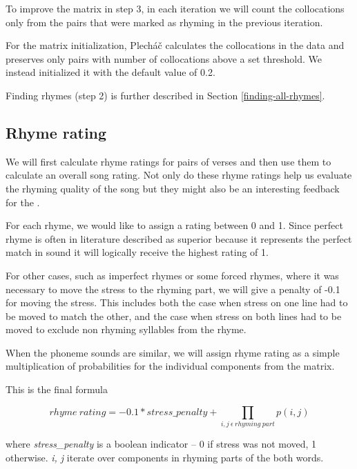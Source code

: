 To improve the matrix in step 3, in each iteration we will count the collocations only from the pairs that were marked as rhyming in the previous iteration.

For the matrix initialization, Plecháč calculates the collocations in the data and preserves only pairs with number of collocations above a set threshold. We instead initialized it with the default value of 0.2. 

Finding rhymes (step 2) is further described in Section \ref{finding-all-rhymes}.


\subsection{Rhyme rating}\label{rhyme-rating}
 We will first calculate rhyme ratings for pairs of verses and then use them to calculate an overall song rating. Not only do these rhyme ratings help us evaluate the rhyming quality of the song but they might also be an interesting feedback for the .
 
 
 For each rhyme, we would like to assign a rating between 0 and 1. Since perfect rhyme is often in literature described as superior because it represents the perfect match in sound it will logically receive the highest rating of 1.
 
 For other cases, such as imperfect rhymes or some forced rhymes, where it was necessary to move the stress to the rhyming part, we will give a penalty of -0.1 for moving the stress. This includes both the case when stress on one line had to be moved to match the other, and the case when stress on both lines had to be moved to exclude non rhyming syllables from the rhyme.
  
	When the phoneme sounds are similar, we will assign rhyme rating as a simple multiplication of probabilities for the individual components from the matrix. 

This is the final formula
	
	\[rhyme\ rating = -0.1 * stress\_penalty + \prod_{i,j\ \epsilon\ rhyming\ part} p(i,j) \]
	
where \textit{stress\_penalty} is a boolean indicator -- 0 if stress was not moved, 1 otherwise.
 \textit{i, j} iterate over components in rhyming parts of the both words.





